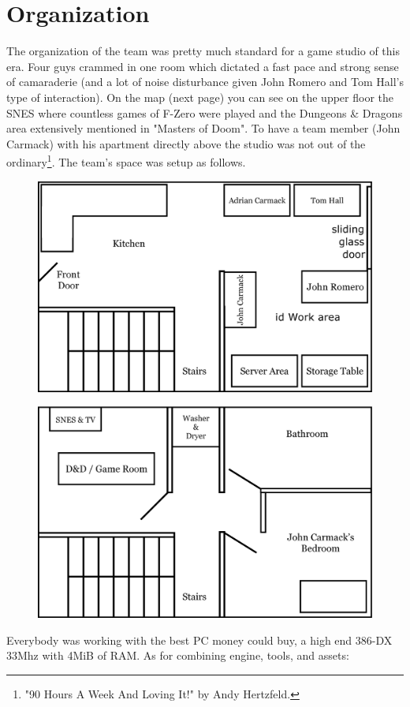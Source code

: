 \documentclass[book.tex]{subfiles}
\begin{document}
\section{Organization}
The organization of the team was pretty much standard for a game studio of this era. Four guys crammed in one room which dictated a fast pace and strong sense of camaraderie (and a lot of noise disturbance given John Romero and Tom Hall's type of interaction). On the map (next page) you can see on the upper floor the SNES where countless games of F-Zero were played and the Dungeons \& Dragons area extensively mentioned in "Masters of Doom". To have a team member (John Carmack) with his apartment directly above the studio was not out of the ordinary\footnote{ "90 Hours A Week And Loving It!" by Andy Hertzfeld.}. The team's space was setup as follows.
\par
\begin{figure}[H]
  \centering
  \includegraphics[width=\textwidth]{imgs/drawings/map/id-software-office-madison_bottom_floor.eps}
\end{figure}
\par
\begin{figure}[H]
  \centering
  \includegraphics[width=\textwidth]{imgs/drawings/map/id-software-office-madison_top_floor.eps}
\end{figure}
Everybody was working with the best PC money could buy, a high end 386-DX 33Mhz with 4MiB of RAM. As for combining engine, tools, and assets:\\
\end{document}
